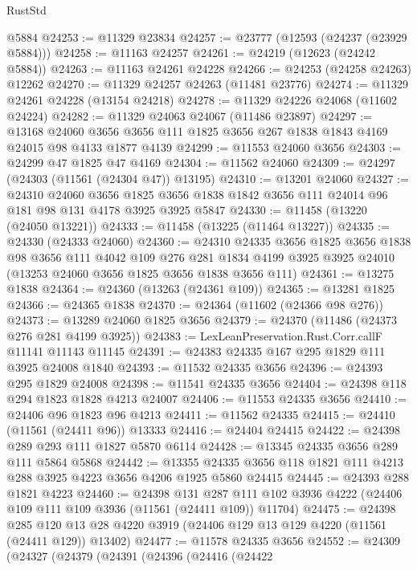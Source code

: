 \begin{lexlean}{RustStd}
\begin{coremodule}
    @5884
@24253 := @11329 @23834
@24257 := @23777 (@12593 (@24237 (@23929 @5884)))
@24258 := @11163 @24257
@24261 := @24219 (@12623 (@24242 @5884))
@24263 := @11163 @24261 @24228
@24266 := @24253 (@24258 @24263) @12262
@24270 := @11329 @24257 @24263 (@11481 @23776)
@24274 := @11329 @24261 @24228 (@13154 @24218)
@24278 := @11329 @24226 @24068 (@11602 @24224)
@24282 := @11329 @24063 @24067 (@11486 @23897)
@24297 := @13168
    @24060
    @3656
    @3656
    @111
    @1825
    @3656
    @267
    @1838
    @1843
    @4169
    @24015
    @98
    @4133
    @1877
    @4139
@24299 := @11553 @24060 @3656
@24303 := @24299 @47 @1825 @47 @4169
@24304 := @11562 @24060
@24309 := @24297 (@24303 (@11561 (@24304 @47)) @13195)
@24310 := @13201 @24060
@24327 := @24310
    @24060
    @3656
    @1825
    @3656
    @1838
    @1842
    @3656
    @111
    @24014
    @96
    @181
    @98
    @131
    @4178
    @3925
    @3925
    @5847
@24330 := @11458 (@13220 (@24050 @13221))
@24333 := @11458 (@13225 (@11464 @13227))
@24335 := @24330 (@24333 @24060)
@24360 := @24310
    @24335
    @3656
    @1825
    @3656
    @1838
    @98
    @3656
    @111
    @4042
    @109
    @276
    @281
    @1834
    @4199
    @3925
    @3925
    @24010
    (@13253 @24060 @3656 @1825 @3656 @1838 @3656 @111)
@24361 := @13275 @1838
@24364 := @24360 (@13263 (@24361 @109))
@24365 := @13281 @1825
@24366 := @24365 @1838
@24370 := @24364 (@11602 (@24366 @98 @276))
@24373 := @13289 @24060 @1825 @3656
@24379 := @24370 (@11486 (@24373 @276 @281 @4199 @3925))
@24383 := LexLeanPreservation.Rust.Corr.callF @11141 @11143 @11145
@24391 := @24383 @24335 @167 @295 @1829 @111 @3925 @24008 @1840
@24393 := @11532 @24335 @3656
@24396 := @24393 @295 @1829 @24008
@24398 := @11541 @24335 @3656
@24404 := @24398 @118 @294 @1823 @1828 @4213 @24007
@24406 := @11553 @24335 @3656
@24410 := @24406 @96 @1823 @96 @4213
@24411 := @11562 @24335
@24415 := @24410 (@11561 (@24411 @96)) @13333
@24416 := @24404 @24415
@24422 := @24398 @289 @293 @111 @1827 @5870 @6114
@24428 := @13345 @24335 @3656 @289 @111 @5864 @5868
@24442 := @13355 @24335 @3656 @118 @1821 @111 @4213 @288 @3925 @4223 @3656 @4206 @1925 @5860 @24415
@24445 := @24393 @288 @1821 @4223
@24460 := @24398
    @131
    @287
    @111
    @102
    @3936
    @4222
    (@24406 @109 @111 @109 @3936 (@11561 (@24411 @109)) @11704)
@24475 := @24398
    @285
    @120
    @13
    @28
    @4220
    @3919
    (@24406 @129 @13 @129 @4220 (@11561 (@24411 @129)) @13402)
@24477 := @11578 @24335 @3656
@24552 := @24309
    (@24327
      (@24379
        (@24391
          (@24396
            (@24416
              (@24422

\end{coremodule}
\end{lexlean}
